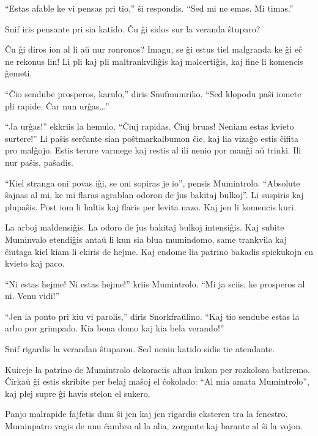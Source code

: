``Estas afable ke vi pensas pri tio,'' ŝi respondis. ``Sed mi ne emas. Mi timas.''

Snif iris pensante pri sia katido. Ĉu ĝi sidos sur la veranda ŝtuparo?

Ĉu ĝi diros ion al li aŭ nur ronronos? Imagu, se ĝi estus tiel malgranda ke ĝi eĉ ne rekonus lin! Li pli kaj pli maltrankviliĝis kaj malcertiĝis, kaj fine li komencis ĝemeti.

``Ĉio sendube prosperos, karulo,'' diris Snufmumriko. ``Sed klopodu paŝi iomete pli rapide. Ĉar nun urĝas{\ldots}''

``Ja urĝas!'' ekkriis la hemulo. ``Ĉiuj rapidas. Ĉiuj bruas! Neniam estas kvieto surtere!'' Li paŝis serĉante sian poŝtmarkalbumon ĉie, kaj lia vizaĝo estis ĉifita pro malĝojo. Estis terure varmege kaj restis al ili nenio por manĝi aŭ trinki. Ili nur paŝis, paŝadis.

``Kiel stranga oni povas iĝi, se oni sopiras je io'', pensis Mumintrolo. ``Absolute ŝajnas al mi, ke mi flaras agrablan odoron de ĵus bakitaj bulkoj''. Li suspiris kaj plupaŝis. Post iom li haltis kaj flaris per levita nazo. Kaj jen li komencis kuri.

La arboj maldensiĝis. La odoro de ĵus bakitaj bulkoj intensiĝis. Kaj subite Muminvalo etendiĝis antaŭ li kun sia blua mumindomo, same trankvila kaj ĉiutaga kiel kiam li ekiris de hejme. Kaj endome lia patrino bakadis spickukojn en kvieto kaj paco.

``Ni estas hejme! Ni estas hejme!'' kriis Mumintrolo. ``Mi ja sciis, ke prosperos al ni. Venu vidi!''

``Jen la ponto pri kiu vi parolis,'' diris Snorkfraŭlino. ``Kaj tio sendube estas la arbo por grimpado. Kia bona domo kaj kia bela verando!''

Snif rigardis la verandan ŝtuparon. Sed neniu katido sidis tie atendante.

Kuireje la patrino de Mumintrolo dekoraciis altan kukon per rozkolora batkremo. Ĉirkaŭ ĝi estis skribite per belaj maŝoj el ĉokolado: ``Al mia amata Mumintrolo'', kaj plej supre ĝi havis stelon el sukero.

Panjo malrapide fajfetis dum ŝi jen kaj jen rigardis eksteren tra la fenestro. Muminpatro vagis de unu ĉambro al la alia, zorgante kaj barante al ŝi la vojon.

